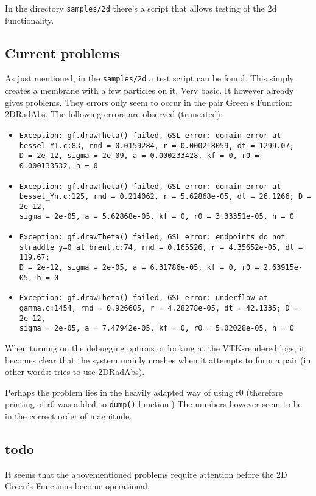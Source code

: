 \documentclass[a4paper,10pt]{article}
\begin{document}
In the directory \verb|samples/2d| there's a script that allows testing of the 2d functionality.

\subsection{Current problems}

As just mentioned, in the \verb|samples/2d| a test script can be found. This simply creates a membrane with a few particles on it. Very basic. It however already gives problems. They errors only seem to occur in the pair Green's Function: 2DRadAbs. 
  The following errors are observed (truncated):

\begin{itemize}
 \item \begin{verbatim}
Exception: gf.drawTheta() failed, GSL error: domain error at 
bessel_Y1.c:83, rnd = 0.0159284, r = 0.000218059, dt = 1299.07; 
D = 2e-12, sigma = 2e-09, a = 0.000233428, kf = 0, r0 = 0.000133532, h = 0
\end{verbatim}
 \item \begin{verbatim}
Exception: gf.drawTheta() failed, GSL error: domain error at 
bessel_Yn.c:125, rnd = 0.214062, r = 5.62868e-05, dt = 26.1266; D = 2e-12, 
sigma = 2e-05, a = 5.62868e-05, kf = 0, r0 = 3.33351e-05, h = 0
\end{verbatim}
 \item \begin{verbatim}
Exception: gf.drawTheta() failed, GSL error: endpoints do not 
straddle y=0 at brent.c:74, rnd = 0.165526, r = 4.35652e-05, dt = 119.67; 
D = 2e-12, sigma = 2e-05, a = 6.31786e-05, kf = 0, r0 = 2.63915e-05, h = 0
\end{verbatim}
 \item \begin{verbatim}Exception: gf.drawTheta() failed, GSL error: underflow at 
gamma.c:1454, rnd = 0.926605, r = 4.28278e-05, dt = 42.1335; D = 2e-12, 
sigma = 2e-05, a = 7.47942e-05, kf = 0, r0 = 5.02028e-05, h = 0
\end{verbatim}
\end{itemize}

When turning on the debugging options or looking at the VTK-rendered logs, it becomes clear that the system mainly crashes when it attempts to form a pair (in other words: tries to use 2DRadAbs).

Perhaps the problem lies in the heavily adapted way of using r0 (therefore printing of r0 was added to \verb|dump()| function.) The numbers however seem to lie in the correct order of magnitude.

\subsection{todo}

It seems that the abovementioned problems require attention before the 2D Green's Functions become operational.  
\end{document}
